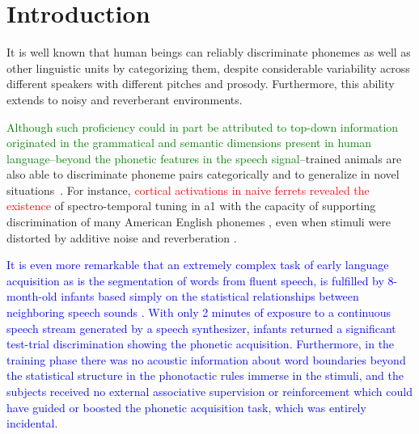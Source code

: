 \documentclass[10pt,letterpaper]{article}
\begin{document}
\linenumbers

\section*{Introduction}





It is well known that human beings can reliably discriminate phonemes as well as other linguistic units by categorizing them, despite considerable variability across different speakers with different pitches and prosody. Furthermore, this ability extends to noisy and reverberant environments.

\textcolor{green}{Although such proficiency could in part be attributed to top-down information \cite{PMID:17451657} originated in the grammatical and semantic \cite{OBLESER2011713,10.1093/cercor/bhp128} dimensions present in human language--beyond the phonetic features in the speech signal}--trained animals are also able to discriminate phoneme pairs categorically and to generalize in novel situations~\cite{kuhl_1975, kuhl_1983, kluender_1998, pons_2006, hienz_1996, dent_1997, lotto_1997}. For instance, \textcolor{red}{cortical activations in naive ferrets revealed the existence} of spectro-temporal tuning in \gls{a1} with the capacity of supporting discrimination of many American English phonemes \cite{mesgarani_2008}, even when stimuli were distorted by additive noise and reverberation \cite{mesgarani_2014A}.

\textcolor{blue}{It is even more remarkable that an extremely complex task of early language acquisition as is the segmentation of words from fluent speech, is fulfilled by 8-month-old infants based simply on the statistical relationships between neighboring speech sounds \cite{Saffran1996StatisticalLB}. With only 2 minutes of exposure to a continuous speech stream generated by a speech synthesizer, infants returned a significant test-trial discrimination showing the phonetic acquisition. Furthermore, in the training phase there was no acoustic information about word boundaries beyond the statistical structure in the phonotactic rules immerse in the stimuli, and the subjects received no external associative supervision or reinforcement which could have guided or boosted the phonetic acquisition task, which was entirely incidental}.
\end{document}

